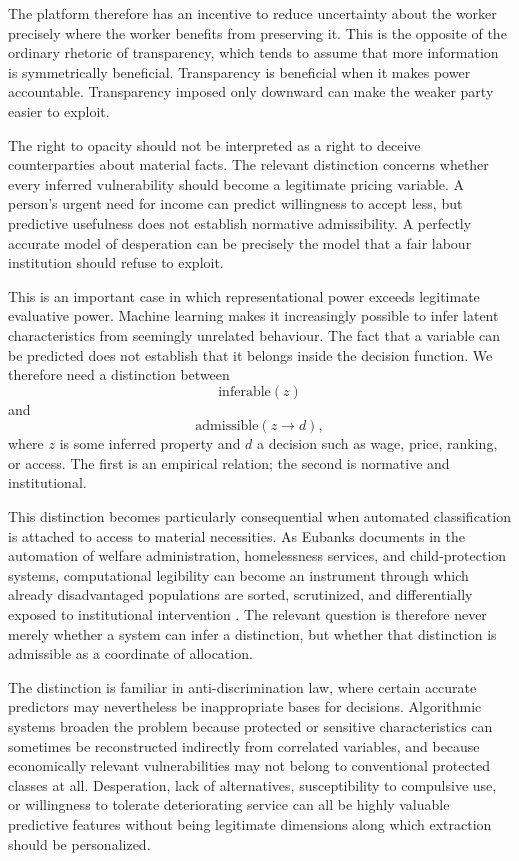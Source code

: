 \documentclass[11pt]{article}
\begin{document}
The platform therefore has an incentive to reduce uncertainty about the worker precisely where the worker benefits from preserving it. This is the opposite of the ordinary rhetoric of transparency, which tends to assume that more information is symmetrically beneficial. Transparency is beneficial when it makes power accountable. Transparency imposed only downward can make the weaker party easier to exploit.

The right to opacity should not be interpreted as a right to deceive counterparties about material facts. The relevant distinction concerns whether every inferred vulnerability should become a legitimate pricing variable. A person's urgent need for income can predict willingness to accept less, but predictive usefulness does not establish normative admissibility. A perfectly accurate model of desperation can be precisely the model that a fair labour institution should refuse to exploit.

This is an important case in which representational power exceeds legitimate evaluative power. Machine learning makes it increasingly possible to infer latent characteristics from seemingly unrelated behaviour. The fact that a variable can be predicted does not establish that it belongs inside the decision function. We therefore need a distinction between
\[
\text{inferable}(z)
\]
and
\[
\text{admissible}(z\rightarrow d),
\]
where \(z\) is some inferred property and \(d\) a decision such as wage, price, ranking, or access. The first is an empirical relation; the second is normative and institutional.

This distinction becomes particularly consequential when automated classification is attached to access to material necessities. As Eubanks documents in the automation of welfare administration, homelessness services, and child-protection systems, computational legibility can become an instrument through which already disadvantaged populations are sorted, scrutinized, and differentially exposed to institutional intervention \parencite{eubanks2018automating}. The relevant question is therefore never merely whether a system can infer a distinction, but whether that distinction is admissible as a coordinate of allocation.

The distinction is familiar in anti-discrimination law, where certain accurate predictors may nevertheless be inappropriate bases for decisions. Algorithmic systems broaden the problem because protected or sensitive characteristics can sometimes be reconstructed indirectly from correlated variables, and because economically relevant vulnerabilities may not belong to conventional protected classes at all. Desperation, lack of alternatives, susceptibility to compulsive use, or willingness to tolerate deteriorating service can all be highly valuable predictive features without being legitimate dimensions along which extraction should be personalized.
\end{document}
